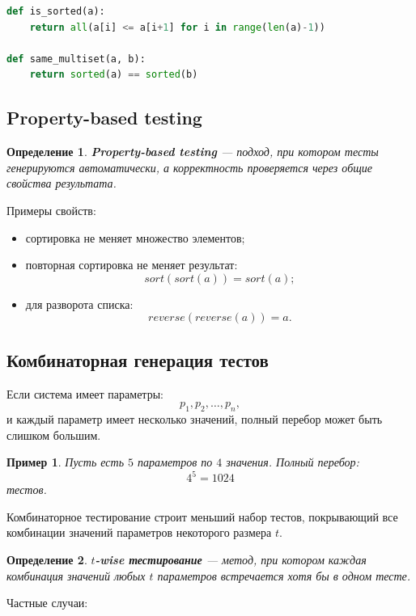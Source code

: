\documentclass[12pt,a4paper]{article}
\newtheorem{definition}{Определение}
\newtheorem{example}{Пример}
\begin{document}
\begin{lstlisting}[language=Python]
def is_sorted(a):
    return all(a[i] <= a[i+1] for i in range(len(a)-1))

def same_multiset(a, b):
    return sorted(a) == sorted(b)
\end{lstlisting}

\subsection{Property-based testing}

\begin{definition}
\textbf{Property-based testing} --- подход, при котором тесты генерируются автоматически, а корректность проверяется через общие свойства результата.
\end{definition}

Примеры свойств:

\begin{itemize}
    \item сортировка не меняет множество элементов;
    \item повторная сортировка не меняет результат:
    \[
    sort(sort(a)) = sort(a);
    \]
    \item для разворота списка:
    \[
    reverse(reverse(a))=a.
    \]
\end{itemize}

\subsection{Комбинаторная генерация тестов}

Если система имеет параметры:
\[
p_1,p_2,\dots,p_n,
\]
и каждый параметр имеет несколько значений, полный перебор может быть слишком большим.

\begin{example}
Пусть есть $5$ параметров по $4$ значения. Полный перебор:
\[
4^5=1024
\]
тестов.
\end{example}

Комбинаторное тестирование строит меньший набор тестов, покрывающий все комбинации значений параметров некоторого размера $t$.

\begin{definition}
\textbf{$t$-wise тестирование} --- метод, при котором каждая комбинация значений любых $t$ параметров встречается хотя бы в одном тесте.
\end{definition}

Частные случаи:
\end{document}

